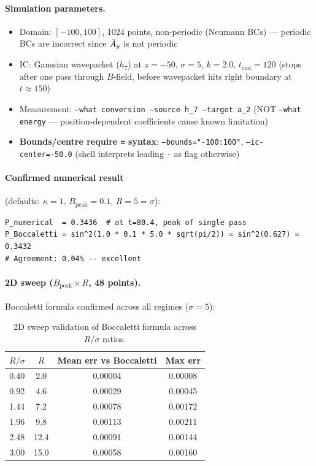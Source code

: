 \paragraph{Simulation parameters.}
\begin{itemize}
  \item Domain: $[-100, 100]$, 1024 points, non-periodic (Neumann BCs) --- periodic BCs are incorrect since $\bar{A}_y$ is not periodic
  \item IC: Gaussian wavepacket ($h_7$) at $z = -50$, $\sigma = 5$, $k = 2.0$, $t_\mathrm{end} = 120$ (stops after one pass through $B$-field, before wavepacket hits right boundary at $t \approx 150$)
  \item Measurement: \texttt{--what conversion --source h\_7 --target a\_2} (NOT \texttt{--what energy} --- position-dependent coefficients cause known limitation)
  \item \textbf{Bounds/centre require \texttt{=} syntax}: \texttt{--bounds="-100:100"}, \texttt{--ic-center=-50.0} (shell interprets leading \texttt{-} as flag otherwise)
\end{itemize}

\paragraph{Confirmed numerical result} (defaults: $\kappa = 1$, $B_\mathrm{peak} = 0.1$, $R = 5 = \sigma$):
\begin{lstlisting}[style=python]
P_numerical  = 0.3436  # at t=80.4, peak of single pass
P_Boccaletti = sin^2(1.0 * 0.1 * 5.0 * sqrt(pi/2)) = sin^2(0.627) = 0.3432
# Agreement: 0.04% -- excellent
\end{lstlisting}

\paragraph{2D sweep ($B_\mathrm{peak} \times R$, 48 points).}
Boccaletti formula confirmed across all regimes ($\sigma = 5$):

\begin{table}[htbp]
\centering
\caption{2D sweep validation of Boccaletti formula across $R/\sigma$ ratios.}
\label{tab:gert-boccaletti-sweep}
\begin{tabular}{@{}cccc@{}}
\toprule
$R/\sigma$ & $R$ & Mean err vs Boccaletti & Max err \\
\midrule
0.40 &  2.0 & 0.00004 & 0.00008 \\
0.92 &  4.6 & 0.00029 & 0.00045 \\
1.44 &  7.2 & 0.00078 & 0.00172 \\
1.96 &  9.8 & 0.00113 & 0.00211 \\
2.48 & 12.4 & 0.00091 & 0.00144 \\
3.00 & 15.0 & 0.00058 & 0.00160 \\
\bottomrule
\end{tabular}
\end{table}

